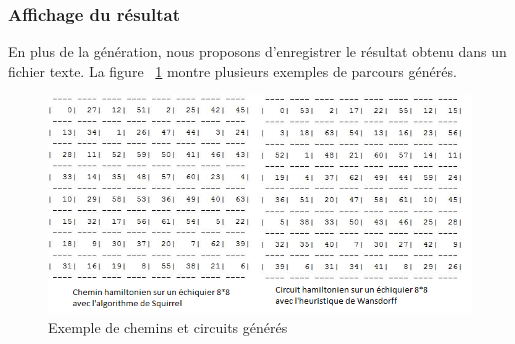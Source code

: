\subsubsection{Affichage du résultat}
En plus de la génération, nous proposons d'enregistrer le résultat obtenu dans un fichier texte. La figure ~\ref{ExempleImpression} montre plusieurs exemples de parcours générés.

\begin{figure}[h]
\begin{center}
   \includegraphics[scale=0.6]{img/exempleimpression.png} 
   \caption{\label{ExempleImpression} Exemple de chemins et circuits générés}
   \end{center}
\end{figure}
